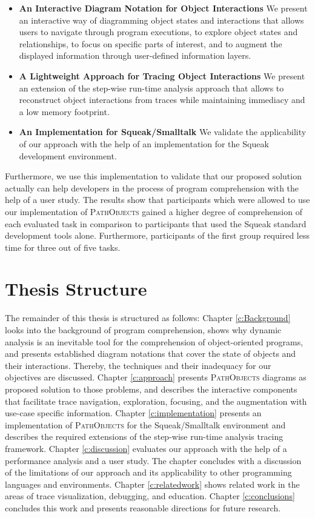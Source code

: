 \begin{itemize}
\renewcommand{\labelitemiv}{$\ast$}

\item \textbf{An Interactive Diagram Notation for Object Interactions} We present an interactive way of diagramming object states and interactions that allows users to navigate through program executions, to explore object states and relationships, to focus on specific parts of interest, and to augment the displayed information through user-defined information layers.

\item \textbf{A Lightweight Approach for Tracing Object Interactions} We present an extension of the step-wise run-time analysis approach that allows to reconstruct object interactions from traces while maintaining immediacy and a low memory footprint.

\item \textbf{An Implementation for Squeak/Smalltalk} We validate the applicability of our approach with the help of an implementation for the Squeak development environment.
\end{itemize}

Furthermore, we use this implementation to validate that our proposed solution actually can help developers in the process of program comprehension with the help of a user study. 
The results show that participants which were allowed to use our implementation of \textsc{PathObjects} gained a higher degree of comprehension of each evaluated task in comparison to participants that used the Squeak standard development tools alone.
Furthermore, participants of the first group required less time for three out of five tasks.

\section{Thesis Structure}
The remainder of this thesis is structured as follows:
Chapter \ref{c:Background} looks into the background of program comprehension, shows why dynamic analysis is an inevitable tool for the comprehension of object-oriented programs, and presents established diagram notations that cover the state of objects and their interactions.
Thereby, the techniques and their inadequacy for our objectives are discussed.
Chapter \ref{c:approach} presents \textsc{PathObjects} diagrams as proposed solution to those problems, and describes the interactive components that facilitate trace navigation, exploration, focusing, and the augmentation with use-case specific information.
Chapter \ref{c:implementation} presents an implementation of \textsc{PathObjects} for the Squeak/Smalltalk environment and describes the required extensions of the step-wise run-time analysis tracing framework.
Chapter \ref{c:discussion} evaluates our approach with the help of a performance analysis and a user study. 
The chapter concludes with a discussion of the limitations of our approach and its applicability to other programming languages and environments.
Chapter \ref{c:relatedwork} shows related work in the areas of trace visualization, debugging, and education.
Chapter \ref{c:conclusions} concludes this work and presents reasonable directions for future research.